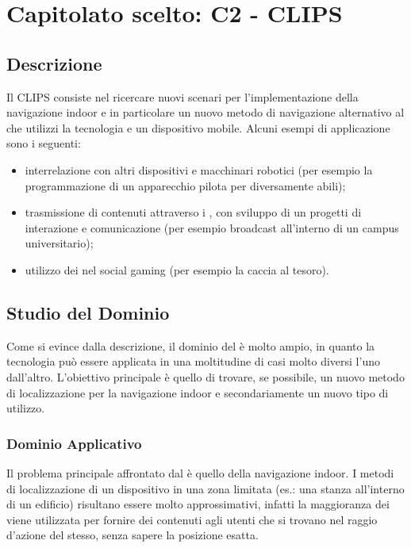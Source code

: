 \section{Capitolato scelto: C2 - CLIPS}

\subsection{Descrizione}

Il  CLIPS consiste nel ricercare nuovi scenari per l'implementazione della navigazione indoor e in particolare 
un nuovo metodo di navigazione alternativo al  che utilizzi la tecnologia  e un dispositivo mobile.
Alcuni esempi di applicazione sono i seguenti:
\begin{itemize}
	\item interrelazione con altri dispositivi e macchinari robotici (per esempio la programmazione di un apparecchio pilota per diversamente abili);
	\item trasmissione di contenuti attraverso i , con sviluppo di un progetti di interazione e comunicazione (per esempio broadcast all'interno di un campus universitario);
	\item utilizzo dei  nel social gaming (per esempio la caccia al tesoro).
\end{itemize}

\subsection{Studio del Dominio}

Come si evince dalla descrizione, il dominio del  è molto ampio, in quanto la tecnologia  può essere applicata in una moltitudine
di casi molto diversi l'uno dall'altro. L'obiettivo principale è quello di trovare, se possibile, un nuovo metodo di localizzazione per la navigazione indoor e secondariamente
un nuovo tipo di utilizzo.


\subsubsection{Dominio Applicativo}
Il problema principale affrontato dal  è quello della navigazione indoor. I metodi di localizzazione di un dispositivo in una zona limitata (es.: una stanza all'interno di un edificio)
risultano essere molto approssimativi, infatti la maggioranza dei  viene utilizzata per fornire dei contenuti agli utenti che si trovano nel raggio d'azione del  stesso, senza sapere 
la posizione esatta.

